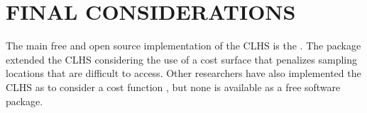 \section{FINAL CONSIDERATIONS}

The main free and open source implementation of the CLHS is the  \cite{RoudierEtAl2012}. The 
package extended the CLHS considering the use of a cost surface that penalizes sampling locations that are 
difficult to access. Other researchers have also implemented the CLHS as to consider a cost function 
\cite{MulderEtAl2013, CliffordEtAl2014}, but none is available as a free software package.

